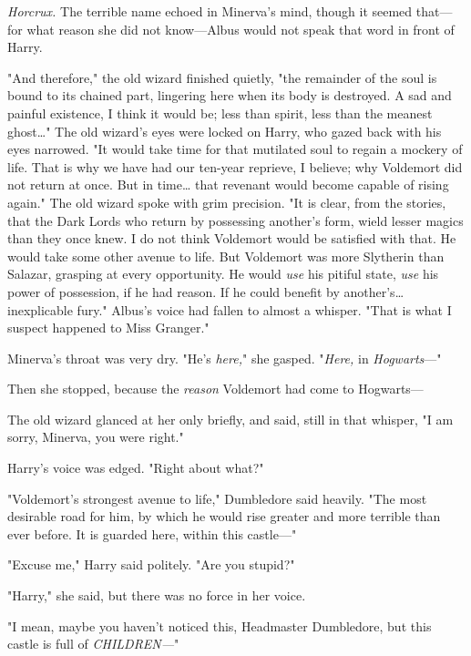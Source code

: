 \emph{Horcrux.} The terrible name echoed in Minerva's mind, though it seemed 
that---for what reason she did not know---Albus would not speak that word in 
front of Harry.

"And therefore," the old wizard finished quietly, "the remainder of the soul is 
bound to its chained part, lingering here when its body is destroyed. A sad and 
painful existence, I think it would be; less than spirit, less than the meanest 
ghost{\ldots}" The old wizard's eyes were locked on Harry, who gazed back with 
his eyes narrowed. "It would take time for that mutilated soul to regain a 
mockery of life. That is why we have had our ten-year reprieve, I believe; why 
Voldemort did not return at once. But in time{\ldots} that revenant would 
become capable of rising again." The old wizard spoke with grim precision. "It 
is clear, from the stories, that the Dark Lords who return by possessing 
another's form, wield lesser magics than they once knew. I do not think 
Voldemort would be satisfied with that. He would take some other avenue to 
life. But Voldemort was more Slytherin than Salazar, grasping at every 
opportunity. He would \emph{use} his pitiful state, \emph{use} his power of 
possession, if he had reason. If he could benefit by another's{\ldots} 
inexplicable fury." Albus's voice had fallen to almost a whisper. "That is what 
I suspect happened to Miss Granger."

Minerva's throat was very dry. "He's \emph{here,}" she gasped. "\emph{Here,} in 
\emph{Hogwarts}---"

Then she stopped, because the \emph{reason} Voldemort had come to Hogwarts---

The old wizard glanced at her only briefly, and said, still in that whisper, "I 
am sorry, Minerva, you were right."

Harry's voice was edged. "Right about what?"

"Voldemort's strongest avenue to life," Dumbledore said heavily. "The most 
desirable road for him, by which he would rise greater and more terrible than 
ever before. It is guarded here, within this castle---"

"Excuse me," Harry said politely. "Are you stupid?"

"Harry," she said, but there was no force in her voice.

"I mean, maybe you haven't noticed this, Headmaster Dumbledore, but this castle 
is full of \emph{CHILDREN---}"

